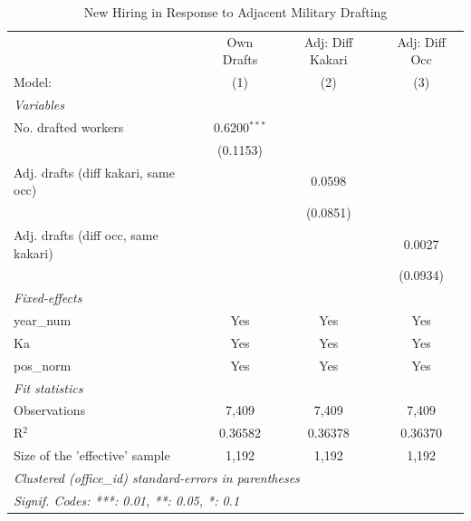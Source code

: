 \begin{table}[htbp]
\centering
\caption{New Hiring in Response to Adjacent Military Drafting}
\label{tab:reallocation-adjacent}
\begin{threeparttable}
\begin{tabular}{lccc}
   \tabularnewline \midrule \midrule
                                       & Own Drafts     & Adj: Diff Kakari & Adj: Diff Occ \\   
   Model:                              & (1)            & (2)              & (3)\\  
   \midrule
   \emph{Variables}\\
   No. drafted workers                 & 0.6200$^{***}$ &                  &   \\   
                                       & (0.1153)       &                  &   \\   
   Adj. drafts (diff kakari, same occ) &                & 0.0598           &   \\   
                                       &                & (0.0851)         &   \\   
   Adj. drafts (diff occ, same kakari) &                &                  & 0.0027\\   
                                       &                &                  & (0.0934)\\   
   \midrule
   \emph{Fixed-effects}\\
   year\_num                           & Yes            & Yes              & Yes\\  
   Ka                                  & Yes            & Yes              & Yes\\  
   pos\_norm                           & Yes            & Yes              & Yes\\  
   \midrule
   \emph{Fit statistics}\\
   Observations                        & 7,409          & 7,409            & 7,409\\  
   R$^2$                               & 0.36582        & 0.36378          & 0.36370\\  
   Size of the 'effective' sample      & 1,192          & 1,192            & 1,192\\  
   \midrule \midrule
   \multicolumn{4}{l}{\emph{Clustered (office\_id) standard-errors in parentheses}}\\
   \multicolumn{4}{l}{\emph{Signif. Codes: ***: 0.01, **: 0.05, *: 0.1}}\\

\end{tabular}
\end{threeparttable}
\end{table}
